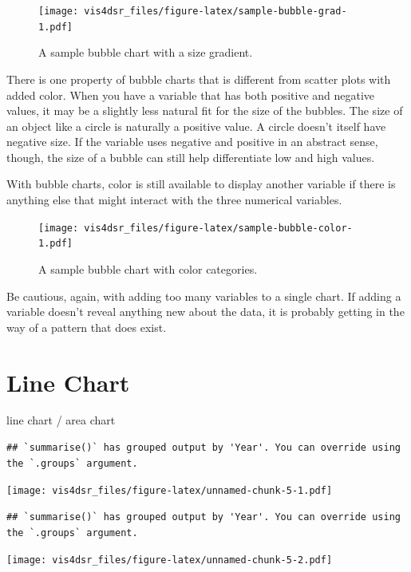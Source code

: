\documentclass[
]{krantz}
\begin{document}
\begin{figure}
\centering
\texttt{[image: vis4dsr\_files/figure-latex/sample-bubble-grad-1.pdf]}
\caption{\label{fig:sample-bubble-grad}A sample bubble chart with a size gradient.}
\end{figure}

There is one property of bubble charts that is different from scatter plots with
added color. When you have a variable that has both positive and negative values,
it may be a slightly less natural fit for the size of the bubbles. The size of an
object like a circle is naturally a positive value. A circle doesn't itself have
negative size. If the variable uses negative and positive in an abstract sense,
though, the size of a bubble can still help differentiate low and high values.

With bubble charts, color is still available to display another variable if there
is anything else that might interact with the three numerical variables.

\begin{figure}
\centering
\texttt{[image: vis4dsr\_files/figure-latex/sample-bubble-color-1.pdf]}
\caption{\label{fig:sample-bubble-color}A sample bubble chart with color categories.}
\end{figure}

Be cautious, again, with adding too many variables to a single chart. If adding
a variable doesn't reveal anything new about the data, it is probably getting in the
way of a pattern that does exist.

\hypertarget{line-chart}{%
\section{Line Chart}\label{line-chart}}

line chart / area chart

\begin{verbatim}
## `summarise()` has grouped output by 'Year'. You can override using the `.groups` argument.
\end{verbatim}

\texttt{[image: vis4dsr\_files/figure-latex/unnamed-chunk-5-1.pdf]}

\begin{verbatim}
## `summarise()` has grouped output by 'Year'. You can override using the `.groups` argument.
\end{verbatim}

\texttt{[image: vis4dsr\_files/figure-latex/unnamed-chunk-5-2.pdf]}
\end{document}
